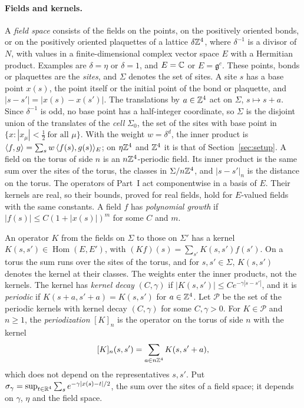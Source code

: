 \paragraph{Fields and kernels.} A \emph{field space} consists of the fields on the points, on the positively oriented bonds, or on the positively oriented plaquettes of a lattice $\delta\mathbb Z^4$, where $\delta^{-1}$ is a divisor of $N$, with values in a finite-dimensional complex vector space $E$ with a Hermitian product. Examples are $\delta=\eta$ or $\delta=1$, and $E=\mathbb C$ or $E=\mathfrak g^c$. These points, bonds or plaquettes are the \emph{sites}, and $\Sigma$ denotes the set of sites. A site $s$ has a base point $x(s)$, the point itself or the initial point of the bond or plaquette, and $|s-s'|=|x(s)-x(s')|$. The translations by $a\in\mathbb Z^4$ act on $\Sigma$, $s\mapsto s+a$. Since $\delta^{-1}$ is odd, no base point has a half-integer coordinate, so $\Sigma$ is the disjoint union of the translates of the \emph{cell} $\Sigma_0$, the set of the sites with base point in $\{x:|x_\mu|<\frac12\ \text{for all }\mu\}$. With the weight $w=\delta^d$, the inner product is $\langle f,g\rangle=\sum_sw\,\langle f(s),g(s)\rangle_E$; on $\eta\mathbb Z^4$ and $\mathbb Z^4$ it is that of Section~\ref{sec:setup}. A field on the torus of side $n$ is an $n\mathbb Z^4$-periodic field. Its inner product is the same sum over the sites of the torus, the classes in $\Sigma/n\mathbb Z^4$, and $|s-s'|_n$ is the distance on the torus. The operators of Part~I act componentwise in a basis of $E$. Their kernels are real, so their bounds, proved for real fields, hold for $E$-valued fields with the same constants. A field $f$ has \emph{polynomial growth} if $|f(s)|\le C(1+|x(s)|)^m$ for some $C$ and $m$.

An operator $K$ from the fields on $\Sigma$ to those on $\Sigma'$ has a kernel $K(s,s')\in\operatorname{Hom}(E,E')$, with $(Kf)(s)=\sum_{s'}K(s,s')f(s')$. On a torus the sum runs over the sites of the torus, and for $s,s'\in\Sigma$, $K(s,s')$ denotes the kernel at their classes. The weights enter the inner products, not the kernels. The kernel has \emph{kernel decay} $(C,\gamma)$ if $|K(s,s')|\le Ce^{-\gamma|s-s'|}$, and it is \emph{periodic} if $K(s+a,s'+a)=K(s,s')$ for $a\in\mathbb Z^4$. Let $\mathscr P$ be the set of the periodic kernels with kernel decay $(C,\gamma)$ for some $C,\gamma>0$. For $K\in\mathscr P$ and $n\ge1$, the \emph{periodization} $[K]_n$ is the operator on the torus of side $n$ with the kernel
\[
[K]_n(s,s')=\sum_{a\in n\mathbb Z^4}K(s,s'+a),
\]
which does not depend on the representatives $s,s'$. Put $\sigma_\gamma=\sup_{t\in\mathbb R^4}\sum_se^{-\gamma|x(s)-t|/2}$, the sum over the sites of a field space; it depends on $\gamma$, $\eta$ and the field space.

